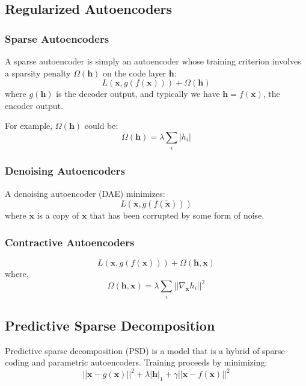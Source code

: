 \documentclass[12pt]{article}
\numberwithin{equation}{section}
\begin{document}
\subsection{Regularized Autoencoders}
\subsubsection{Sparse Autoencoders}
	A sparse autoencoder is simply an autoencoder whose training criterion involves a sparsity penalty $\Omega(\bm{h})$ on the code layer $\bm{h}$:
	\begin{equation}
		L(\bm{x},g(f(\bm{x})))+\Omega(\bm{h})
	\end{equation}
	where $g(\bm{h})$ is the decoder output, and typically we have $\bm{h}=f(\bm{x})$, the encoder output. \par
	For example, $\Omega(\bm{h})$ could be:
	\begin{equation}
		\Omega(\bm{h})=\lambda \sum_i |h_i|
	\end{equation}	
\subsubsection{Denoising Autoencoders}
	A denoising autoencoder (DAE) minimizes:
	\begin{equation}
		L(\bm{x},g(f(\bm{\tilde{x}})))
	\end{equation}	
	where $\bm{\tilde{x}}$ is a copy of $\bm{x}$ that has been corrupted by some form of noise.
\subsubsection{Contractive Autoencoders}
	\begin{equation}
		L(\bm{x},g(f(\bm{x})))+\Omega(\bm{h,x})
	\end{equation}
	where,
	\begin{equation}
		\Omega(\bm{h,x})=\lambda \sum_i  ||{\nabla_{\bm{x}} h_i}||^2
	\end{equation}
\subsection{Predictive Sparse Decomposition}
Predictive sparse decomposition (PSD) is a model that is a hybrid of sparse coding and parametric autoencoders. Training proceeds by minimizing:
	\begin{equation}
		||\bm{x}-g(\bm{x})||^2 + \lambda |\bm{h}|_1 + \gamma ||\bm{x}-f(\bm{x})||^2
	\end{equation}
\end{document}
